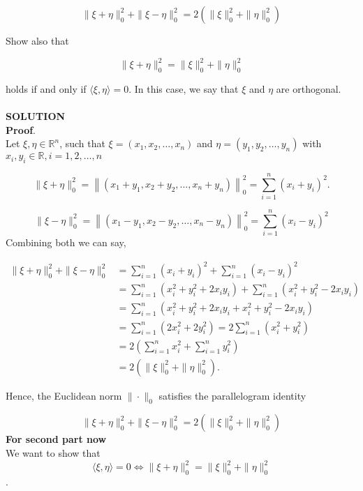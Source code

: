 \documentclass{article}
\begin{document}
$$
\|\xi+\eta\|_{0}^{2}+\|\xi-\eta\|_{0}^{2}=2\left(\|\xi\|_{0}^{2}+\|\eta\|_{0}^{2}\right)
$$

Show also that

$$
\|\xi+\eta\|_{0}^{2}=\|\xi\|_{0}^{2}+\|\eta\|_{0}^{2}
$$

holds if and only if $\langle\xi, \eta\rangle=0$. In this case, we say that $\xi$ and $\eta$ are orthogonal.\\\\

\textbf{SOLUTION}\\

\textbf{Proof}.\\

Let $\xi, \eta \in \mathbb{R}^{n}$, such that $\xi=\left(x_{1}, x_{2}, \ldots, x_{n}\right)$ and $\eta=\left(y_{1}, y_{2}, \ldots, y_{n}\right)$ with $x_{i},y_i \in \mathbb{R}, i=1,2, \ldots, n$

$$
\|\xi+\eta\|_{0}^{2}=\left\|\left(x_{1}+y_{1}, x_{2}+y_{2}, \ldots, x_{n}+y_{n}\right)\right\|_{0}^{2}=\sum_{i=1}^{n}\left(x_{i}+y_{i}\right)^{2} .
$$

$$
\|\xi-\eta\|_{0}^{2}=\left\|\left(x_{1}-y_{1}, x_{2}-y_{2}, \ldots, x_{n}-y_{n}\right)\right\|_{0}^{2}=\sum_{i=1}^{n}\left(x_{i}-y_{i}\right)^{2}
$$
Combining both we can say,

$$
\begin{aligned}
\|\xi+\eta\|_{0}^{2}+\|\xi-\eta\|_{0}^{2} & =\sum_{i=1}^{n}\left(x_{i}+y_{i}\right)^{2}+\sum_{i=1}^{n}\left(x_{i}-y_{i}\right)^{2} \\
& =\sum_{i=1}^{n}\left(x_{i}^{2}+y_{i}^{2}+2 x_{i} y_{i}\right)+\sum_{i=1}^{n}\left(x_{i}^{2}+y_{i}^{2}-2 x_{i} y_{i}\right) \\
& =\sum_{i=1}^{n}\left(x_{i}^{2}+y_{i}^{2}+2 x_{i} y_{i}+x_{i}^{2}+y_{i}^{2}-2 x_{i} y_{i}\right) \\
& =\sum_{i=1}^{n}\left(2 x_{i}^{2}+2 y_{i}^{2}\right)=2 \sum_{i=1}^{n}\left(x_{i}^{2}+y_{i}^{2}\right) \\
& =2\left(\sum_{i=1}^{n} x_{i}^{2}+\sum_{i=1}^{n} y_{i}^{2}\right) \\
& =2\left(\|\xi\|_{0}^{2}+\|\eta\|_{0}^{2}\right) .
\end{aligned}
$$

Hence, the Euclidean norm $\|\cdot\|_{0}$ satisfies the parallelogram identity

$$
\|\xi+\eta\|_{0}^{2}+\|\xi-\eta\|_{0}^{2}=2\left(\|\xi\|_{0}^{2}+\|\eta\|_{0}^{2}\right)
$$
\newpage
\textbf{For second part now}\\
We want to show that  $$\langle\xi, \eta\rangle=0 \iff \|\xi+\eta\|_{0}^{2}=\|\xi\|_{0}^{2}+\|\eta\|_{0}^{2}$$.
\end{document}

